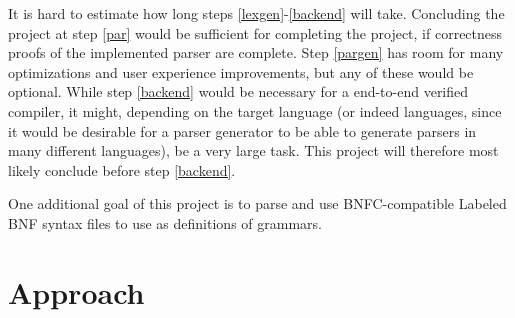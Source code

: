 \documentclass{article}
\begin{document}
	It is hard to estimate how long steps \ref{lexgen}-\ref{backend} will take.
	Concluding the project at step \ref{par} would be sufficient for completing
	the project, if correctness proofs of the implemented parser are complete.
	Step \ref{pargen} has room for many optimizations and user experience
	improvements, but any of these would be optional. While step \ref{backend}
	would be necessary for a end-to-end verified compiler, it might, depending
	on the target language (or indeed languages, since it would be desirable
	for a parser generator to be able to generate parsers in many different
	languages), be a very large task. This project will therefore most likely
	conclude before step \ref{backend}.

	One additional goal of this project is to parse and use BNFC-compatible 
	Labeled BNF syntax files to use as definitions of grammars.

\section{Approach}




\end{document}
